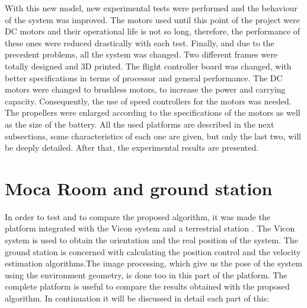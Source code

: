 With this new model, new experimental tests were performed and the behaviour of the system was improved. The motors used until this
point of the project were DC motors and their operational life is not so long, therefore,
the performance of these ones were reduced drastically with each test.
Finally, and due to the precedent problems, all the system was changed. Two different
frames were totally designed and 3D printed. The flight controller board was changed, with
better specifications in terms of processor and general performance. The DC motors were
changed to brushless motors, to increase the power and carrying capacity. Consequently,
the use of speed controllers for the motors was needed. The propellers were enlarged
according to the specifications of the motors as well as the size of the battery.
All the used platforms are described in the next subsections, some characteristics of
each one are given, but only the last two, will be deeply detailed.
After that, the experimental results are presented.


\section{Moca Room and ground station}


In order to test and to compare the proposed algorithm, it was made the platform integrated with the Vicon system and a terrestrial station . The Vicon system is used to obtain the orientation and the real position of the system. The ground station is concerned with calculating the position control and the velocity estimation algorithms.The image processing, which give us the pose of the system using the environment geometry, is done too in this part of the platform. The complete platform is useful to compare the results obtained with the proposed algorithm. In continuation it will be discussed in detail each part of this:


